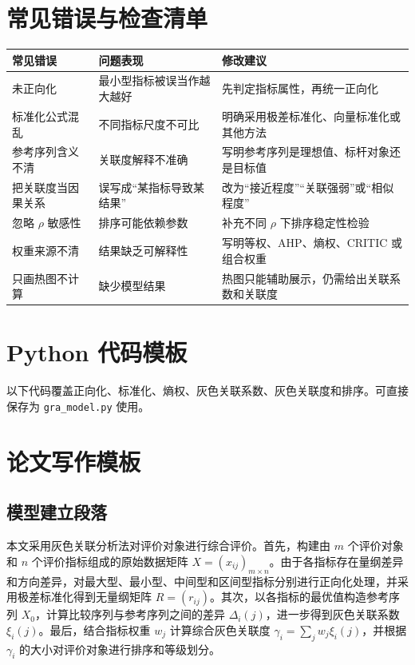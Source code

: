 \documentclass[UTF8,a4paper,11pt]{ctexart}
\begin{document}
\section{常见错误与检查清单}
\begin{longtable}{p{3.5cm}p{5cm}p{5cm}}
\toprule
常见错误 & 问题表现 & 修改建议 \\
\midrule
未正向化 & 最小型指标被误当作越大越好 & 先判定指标属性，再统一正向化 \\
标准化公式混乱 & 不同指标尺度不可比 & 明确采用极差标准化、向量标准化或其他方法 \\
参考序列含义不清 & 关联度解释不准确 & 写明参考序列是理想值、标杆对象还是目标值 \\
把关联度当因果关系 & 误写成“某指标导致某结果” & 改为“接近程度”“关联强弱”或“相似程度” \\
忽略 $\rho$ 敏感性 & 排序可能依赖参数 & 补充不同 $\rho$ 下排序稳定性检验 \\
权重来源不清 & 结果缺乏可解释性 & 写明等权、AHP、熵权、CRITIC 或组合权重 \\
只画热图不计算 & 缺少模型结果 & 热图只能辅助展示，仍需给出关联系数和关联度 \\
\bottomrule
\end{longtable}

\section{Python 代码模板}
以下代码覆盖正向化、标准化、熵权、灰色关联系数、灰色关联度和排序。可直接保存为 \texttt{gra\_model.py} 使用。



\section{论文写作模板}
\subsection{模型建立段落}
本文采用灰色关联分析法对评价对象进行综合评价。首先，构建由 $m$ 个评价对象和 $n$ 个评价指标组成的原始数据矩阵 $X=(x_{ij})_{m\times n}$。由于各指标存在量纲差异和方向差异，对最大型、最小型、中间型和区间型指标分别进行正向化处理，并采用极差标准化得到无量纲矩阵 $R=(r_{ij})$。其次，以各指标的最优值构造参考序列 $X_0$，计算比较序列与参考序列之间的差异 $\Delta_i(j)$，进一步得到灰色关联系数 $\xi_i(j)$。最后，结合指标权重 $w_j$ 计算综合灰色关联度 $\gamma_i=\sum_jw_j\xi_i(j)$，并根据 $\gamma_i$ 的大小对评价对象进行排序和等级划分。
\end{document}
